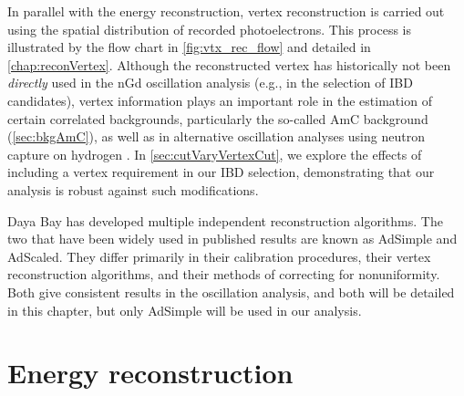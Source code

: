 \documentclass[../thesis.tex]{subfiles}
\begin{document}
In parallel with the energy reconstruction, vertex reconstruction is carried out using the spatial distribution of recorded photoelectrons. This process is illustrated by the flow chart in \autoref{fig:vtx_rec_flow} and detailed in \autoref{chap:reconVertex}. Although the reconstructed vertex has historically not been \emph{directly} used in the nGd oscillation analysis (e.g., in the selection of IBD candidates), vertex information plays an important role in the estimation of certain correlated backgrounds, particularly the so-called AmC background (\autoref{sec:bkgAmC}), as well as in alternative oscillation analyses using neutron capture on hydrogen \cite{new_nH_paper}. In \autoref{sec:cutVaryVertexCut}, we explore the effects of including a vertex requirement in our IBD selection, demonstrating that our analysis is robust against such modifications.

Daya Bay has developed multiple independent reconstruction algorithms. The two that have been widely used in published results are known as AdSimple and AdScaled. They differ primarily in their calibration procedures, their vertex reconstruction algorithms, and their methods of correcting for nonuniformity. Both give consistent results in the oscillation analysis, and both will be detailed in this chapter, but only AdSimple will be used in our analysis.

\section{Energy reconstruction}
\label{sec:reconEnergy}
\end{document}
